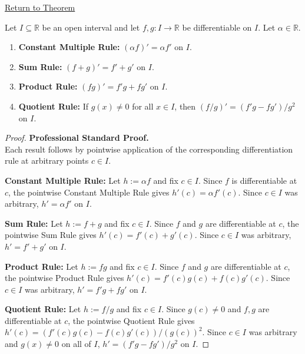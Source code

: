 \newpage
{}
\label{prf:differentiation-on-set}

\begin{remark*}[Return]
\hyperref[thm:finite-linear-combination-rule-interval]{Return to Theorem}
\end{remark*}

\begin{theorem*}
Let $I \subseteq \mathbb{R}$ be an open interval and let $f, g : I \to \mathbb{R}$ be differentiable on $I$. Let $\alpha \in \mathbb{R}$.
\begin{enumerate}
  \item \textbf{Constant Multiple Rule:} $(\alpha f)' = \alpha f'$ on $I$.
  \item \textbf{Sum Rule:} $(f + g)' = f' + g'$ on $I$.
  \item \textbf{Product Rule:} $(fg)' = f'g + fg'$ on $I$.
  \item \textbf{Quotient Rule:} If $g(x) \neq 0$ for all $x \in I$, then $(f/g)' = (f'g - fg')/g^2$ on $I$.
\end{enumerate}
\end{theorem*}

\begin{proof}
\textbf{Professional Standard Proof.}~\\
Each result follows by pointwise application of the corresponding differentiation rule at arbitrary points $c \in I$.

\textbf{Constant Multiple Rule:} Let $h := \alpha f$ and fix $c \in I$. Since $f$ is differentiable at $c$, the pointwise Constant Multiple Rule gives $h'(c) = \alpha f'(c)$. Since $c \in I$ was arbitrary, $h' = \alpha f'$ on $I$.

\textbf{Sum Rule:} Let $h := f + g$ and fix $c \in I$. Since $f$ and $g$ are differentiable at $c$, the pointwise Sum Rule gives $h'(c) = f'(c) + g'(c)$. Since $c \in I$ was arbitrary, $h' = f' + g'$ on $I$.

\textbf{Product Rule:} Let $h := fg$ and fix $c \in I$. Since $f$ and $g$ are differentiable at $c$, the pointwise Product Rule gives $h'(c) = f'(c)g(c) + f(c)g'(c)$. Since $c \in I$ was arbitrary, $h' = f'g + fg'$ on $I$.

\textbf{Quotient Rule:} Let $h := f/g$ and fix $c \in I$. Since $g(c) \neq 0$ and $f, g$ are differentiable at $c$, the pointwise Quotient Rule gives $h'(c) = (f'(c)g(c) - f(c)g'(c))/(g(c))^2$. Since $c \in I$ was arbitrary and $g(x) \neq 0$ on all of $I$, $h' = (f'g - fg')/g^2$ on $I$.
\end{proof}

